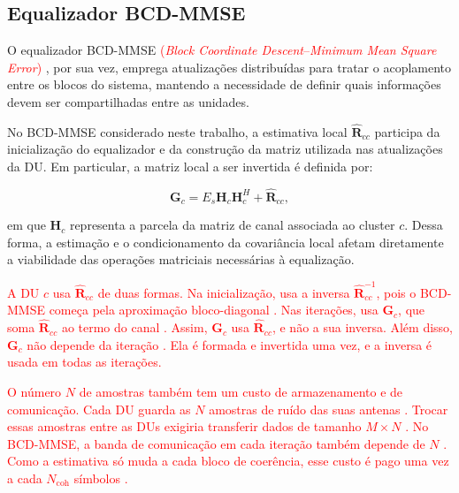 \subsection{Equalizador BCD-MMSE}\label{subsec:bcd}



O equalizador BCD-MMSE \textcolor{red}{(\textit{Block Coordinate Descent}--\textit{Minimum Mean Square Error}) \cite{zhao2025jsac}}, por sua vez, emprega atualizações distribuídas para tratar o acoplamento entre os blocos do sistema, mantendo a necessidade de definir quais informações devem ser compartilhadas entre as unidades.

No BCD-MMSE considerado neste trabalho, a estimativa local $\hat{\mathbf R}_{cc}$ participa da inicialização do equalizador e da construção da matriz utilizada nas atualizações da DU. Em particular, a matriz local a ser invertida é definida por:

\[
\mathbf G_c=
E_s\mathbf H_c\mathbf H_c^H+
\hat{\mathbf R}_{cc},
\]

em que $\mathbf H_c$ representa a parcela da matriz de canal associada ao cluster $c$. Dessa forma, a estimação e o condicionamento da covariância local afetam diretamente a viabilidade das operações matriciais necessárias à equalização.

\textcolor{red}{A DU $c$ usa $\hat{\mathbf R}_{cc}$ de duas formas. Na inicialização, usa a inversa $\hat{\mathbf R}_{cc}^{-1}$, pois o BCD-MMSE começa pela aproximação bloco-diagonal \cite{zhao2025jsac}. Nas iterações, usa $\mathbf G_c$, que soma $\hat{\mathbf R}_{cc}$ ao termo do canal \cite{zhao2025jsac}. Assim, $\mathbf G_c$ usa $\hat{\mathbf R}_{cc}$, e não a sua inversa. Além disso, $\mathbf G_c$ não depende da iteração \cite{zhao2025jsac}. Ela é formada e invertida uma vez, e a inversa é usada em todas as iterações.}

\textcolor{red}{O número $N$ de amostras também tem um custo de armazenamento e de comunicação. Cada DU guarda as $N$ amostras de ruído das suas antenas \cite{zhao2025jsac}. Trocar essas amostras entre as DUs exigiria transferir dados de tamanho $M \times N$ \cite{zhao2025jsac}. No BCD-MMSE, a banda de comunicação em cada iteração também depende de $N$ \cite{zhao2025jsac}. Como a estimativa só muda a cada bloco de coerência, esse custo é pago uma vez a cada $N_{\text{coh}}$ símbolos \cite{zhao2025jsac}.}


